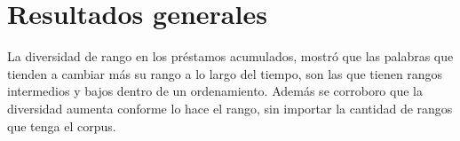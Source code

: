 


\section{Resultados generales}

La diversidad de rango en los préstamos acumulados, mostró que las palabras que tienden a cambiar más su rango a lo largo del tiempo, son las que tienen rangos intermedios y bajos dentro de un ordenamiento. Además se corroboro que la diversidad aumenta conforme lo hace el rango,  sin importar la cantidad de rangos que tenga el corpus. 



 



